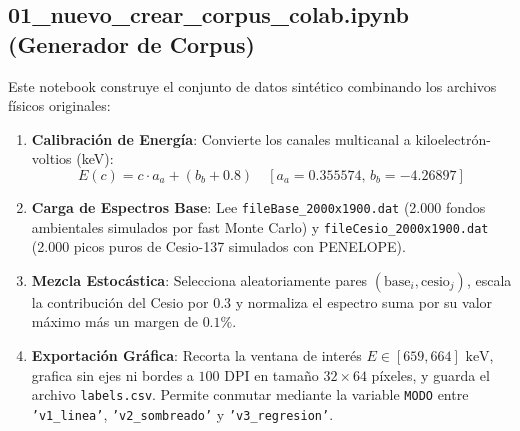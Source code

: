 \documentclass[11pt,a4paper]{article}
\begin{document}
\subsection{01\_nuevo\_crear\_corpus\_colab.ipynb (Generador de Corpus)}
Este notebook construye el conjunto de datos sintético combinando los archivos físicos originales:
\begin{enumerate}
    \item \textbf{Calibración de Energía}: Convierte los canales multicanal a kiloelectrón-voltios (keV):
    \begin{equation}
    E(c) = c \cdot a_a + (b_b + 0.8) \quad [a_a = 0.355574, \, b_b = -4.26897]
    \end{equation}
    \item \textbf{Carga de Espectros Base}: Lee \texttt{fileBase\_2000x1900.dat} (2.000 fondos ambientales simulados por fast Monte Carlo) y \texttt{fileCesio\_2000x1900.dat} (2.000 picos puros de Cesio-137 simulados con PENELOPE).
    \item \textbf{Mezcla Estocástica}: Selecciona aleatoriamente pares $(\text{base}_i, \text{cesio}_j)$, escala la contribución del Cesio por $0.3$ y normaliza el espectro suma por su valor máximo más un margen de $0.1\%$.
    \item \textbf{Exportación Gráfica}: Recorta la ventana de interés $E \in [659, 664]\text{ keV}$, grafica sin ejes ni bordes a $100\text{ DPI}$ en tamaño $32 \times 64$ píxeles, y guarda el archivo \texttt{labels.csv}. Permite conmutar mediante la variable \texttt{MODO} entre \texttt{'v1\_linea'}, \texttt{'v2\_sombreado'} y \texttt{'v3\_regresion'}.
\end{enumerate}
\end{document}
